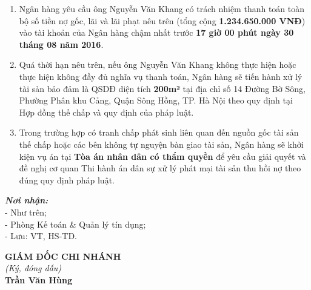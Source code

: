 \documentclass[12pt,a4paper]{article}
\begin{document}
\begin{enumerate}[label=\arabic*., leftmargin=*, itemsep=2pt, topsep=2pt, parsep=0pt]
  \item Ngân hàng yêu cầu ông Nguyễn Văn Khang có trách nhiệm thanh toán toàn bộ số tiền nợ gốc, lãi và lãi phạt nêu trên (tổng cộng \textbf{1.234.650.000 VNĐ}) vào tài khoản của Ngân hàng chậm nhất trước \textbf{17 giờ 00 phút ngày 30 tháng 08 năm 2016}.

  \item Quá thời hạn nêu trên, nếu ông Nguyễn Văn Khang không thực hiện hoặc thực hiện không đầy đủ nghĩa vụ thanh toán, Ngân hàng sẽ tiến hành xử lý tài sản bảo đảm là QSDĐ diện tích \textbf{200m²} tại địa chỉ số 14 Đường Bờ Sông, Phường Phân khu Cảng, Quận Sông Hồng, TP. Hà Nội theo quy định tại Hợp đồng thế chấp và quy định của pháp luật.

  \item Trong trường hợp có tranh chấp phát sinh liên quan đến nguồn gốc tài sản thế chấp hoặc các bên không tự nguyện bàn giao tài sản, Ngân hàng sẽ khởi kiện vụ án tại \textbf{Tòa án nhân dân có thẩm quyền} để yêu cầu giải quyết và đề nghị cơ quan Thi hành án dân sự xử lý phát mại tài sản thu hồi nợ theo đúng quy định pháp luật.


\end{enumerate}
\vspace{0.8cm}
\noindent
\begin{minipage}[t]{0.45\textwidth}
    \textbf{\textit{Nơi nhận:}}\\[0.15cm]
    \fontsize{10pt}{12pt}\selectfont
    - Như trên;\\
    - Phòng Kế toán \& Quản lý tín dụng;\\
    - Lưu: VT, HS-TD.
\end{minipage}
\hfill
\begin{minipage}[t]{0.50\textwidth}
    \begin{center}
        \textbf{GIÁM ĐỐC CHI NHÁNH}\\[0.1cm]
        \textit{(Ký, đóng dấu)}\\[1.6cm]
        \textbf{Trần Văn Hùng}
    \end{center}
\end{minipage}
\end{document}
